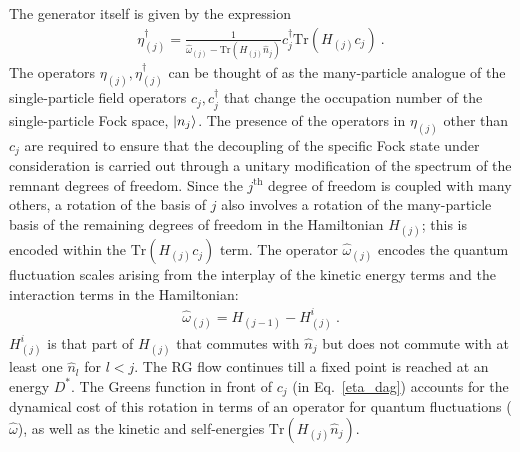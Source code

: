 \documentclass[reprint,prb,superscriptaddress]{revtex4-2}
\begin{document}
The generator itself is given by the expression~\cite{anirbanurg1,anirbanurg2}
\begin{equation}\begin{aligned}
	\label{eta_dag}
	\eta^\dagger_{(j)} = \frac{1}{\hat \omega_{(j)} - \text{Tr}\left(H_{(j)} \hat n_{j}\right) } c^\dagger_{j} \text{Tr}\left(H_{(j)}c_{j}\right)~.
\end{aligned}\end{equation}
{\color{blue}The operators \(\eta_{(j)},\eta^\dagger_{(j)}\) can be thought of as the many-particle analogue of the single-particle field operators \(c_j,c^\dagger_j\) that change the occupation number of the single-particle Fock space, \(\ket{n_j}\). The presence of the operators in $\eta_{(j)}$ other than $c_j$ are required to ensure that the decoupling of the specific Fock state under consideration is carried out through a unitary modification of the spectrum of the remnant degrees of freedom. Since the \(j^\text{th}\) degree of freedom is coupled with many others, a rotation of the basis of \(j\) also involves a rotation of the many-particle basis of the remaining degrees of freedom in the Hamiltonian \(H_{(j)}\); this is encoded within the \(\text{Tr}\left(H_{(j)} c_j\right) \) term.}
The operator \(\hat \omega_{(j)}\) encodes the quantum fluctuation scales arising from the interplay of the kinetic energy terms and the interaction terms in the Hamiltonian:
\begin{equation}\begin{aligned}
	\hat \omega_{(j)} = H_{(j-1)} - H^i_{(j)}~.
\end{aligned}\end{equation}
\(H^i_{(j)}\) is that part of \(H_{(j)}\) that commutes with \(\hat n_j\) but does not commute with at least one \(\hat n_l\) for \(l < j\). The RG flow continues till a fixed point is reached at an energy \(D^*\).
{\color{blue} The Greens function in front of $c_j$ (in Eq.~\ref{eta_dag}) accounts for the dynamical cost of this rotation in terms of an operator for quantum fluctuations (\(\hat \omega\)), as well as the kinetic and self-energies \(\text{Tr}\left( H_{(j)}\hat n_j \right) \).}
\end{document}
